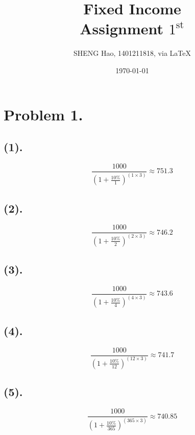 \documentclass{article}
\begin{document}
\title{Fixed Income\\Assignment $1^{\text{st}}$}
\author{{\normalsize SHENG Hao, 1401211818, via \LaTeX}}
\date{\today}

\maketitle

\def \Pr{{\rm Pr}}
\baselineskip 0.6cm


\section{Problem 1.}
\subsection{(1).}
\begin{equation}
   \frac{1000}{(1+\frac{10\%}{1})^{(1 \times 3)}} \approx 751.3
 \end{equation} 

\subsection{(2).}
\begin{equation}
   \frac{1000}{(1+\frac{10\%}{2})^{(2 \times 3)}} \approx 746.2
 \end{equation} 

\subsection{(3).}
\begin{equation}
   \frac{1000}{(1+\frac{10\%}{4})^{(4 \times 3)}} \approx 743.6
 \end{equation} 

\subsection{(4).}
\begin{equation}
   \frac{1000}{(1+\frac{10\%}{12})^{(12 \times 3)}} \approx 741.7
 \end{equation} 

\subsection{(5).}
\begin{equation}
   \frac{1000}{(1+\frac{10\%}{365})^{(365 \times 3)}} \approx 740.85
 \end{equation} 
 
\end{document}
